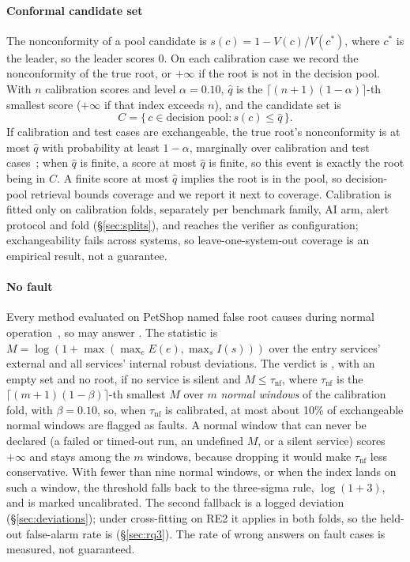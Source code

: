 \paragraph{Conformal candidate set}
The nonconformity of a pool candidate is $s(c) = 1 - V(c)/V(c^\ast)$, where $c^\ast$ is the leader, so the leader scores 0.
On each calibration case we record the nonconformity of the true root, or $+\infty$ if the root is not in the decision pool.
With $n$ calibration scores and level $\alpha = 0.10$, $\hat{q}$ is the $\lceil (n+1)(1-\alpha) \rceil$-th smallest score ($+\infty$ if that index exceeds $n$), and the candidate set is
\begin{equation}
C = \{\, c \in \text{decision pool} : s(c) \leq \hat{q} \,\}.
\end{equation}
If calibration and test cases are exchangeable, the true root's nonconformity is at most $\hat{q}$ with probability at least $1-\alpha$, marginally over calibration and test cases~\cite{angelopoulos2023conformal}; when $\hat{q}$ is finite, a score at most $\hat{q}$ is finite, so this event is exactly the root being in $C$.
A finite score at most $\hat{q}$ implies the root is in the pool, so decision-pool retrieval bounds coverage and we report it next to coverage.
Calibration is fitted only on calibration folds, separately per benchmark family, AI arm, alert protocol and fold (\S\ref{sec:splits}), and reaches the verifier as configuration; exchangeability fails across systems, so leave-one-system-out coverage is an empirical result, not a guarantee.

\paragraph{No fault}
Every method evaluated on PetShop named false root causes during normal operation~\cite{petshop2024}, so \sys may answer \NOFAULT.
The statistic is $M = \log(1 + \max(\max_{e} E(e), \max_{s} I(s)))$ over the entry services' external and all services' internal robust deviations.
The verdict is \NOFAULT, with an empty set and no root, if no service is silent and $M \leq \tau_\text{nf}$, where $\tau_\text{nf}$ is the $\lceil (m+1)(1-\beta) \rceil$-th smallest $M$ over $m$ \emph{normal windows} of the calibration fold, with $\beta = 0.10$, so, when $\tau_\text{nf}$ is calibrated, at most about 10\% of exchangeable normal windows are flagged as faults.
A normal window that can never be declared \NOFAULT (a failed or timed-out run, an undefined $M$, or a silent service) scores $+\infty$ and stays among the $m$ windows, because dropping it would make $\tau_\text{nf}$ less conservative.
With fewer than nine normal windows, or when the index lands on such a window, the threshold falls back to the three-sigma rule, $\log(1+3)$, and is marked uncalibrated.
The second fallback is a logged deviation (\S\ref{sec:deviations}); under cross-fitting on RE2 it applies in both folds, so the held-out false-alarm rate is  (\S\ref{sec:rq3}).
The rate of wrong \NOFAULT answers on fault cases is measured, not guaranteed.

